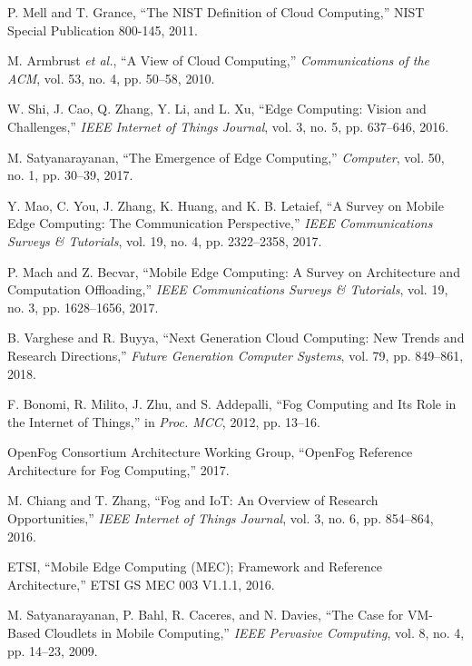 \documentclass[conference]{IEEEtran}
\begin{document}
\begin{thebibliography}{99}

P. Mell and T. Grance, ``The NIST Definition of Cloud Computing,'' NIST Special Publication 800-145, 2011.

M. Armbrust \emph{et al.}, ``A View of Cloud Computing,'' \emph{Communications of the ACM}, vol. 53, no. 4, pp. 50--58, 2010.

W. Shi, J. Cao, Q. Zhang, Y. Li, and L. Xu, ``Edge Computing: Vision and Challenges,'' \emph{IEEE Internet of Things Journal}, vol. 3, no. 5, pp. 637--646, 2016.

M. Satyanarayanan, ``The Emergence of Edge Computing,'' \emph{Computer}, vol. 50, no. 1, pp. 30--39, 2017.

Y. Mao, C. You, J. Zhang, K. Huang, and K. B. Letaief, ``A Survey on Mobile Edge Computing: The Communication Perspective,'' \emph{IEEE Communications Surveys \& Tutorials}, vol. 19, no. 4, pp. 2322--2358, 2017.

P. Mach and Z. Becvar, ``Mobile Edge Computing: A Survey on Architecture and Computation Offloading,'' \emph{IEEE Communications Surveys \& Tutorials}, vol. 19, no. 3, pp. 1628--1656, 2017.

B. Varghese and R. Buyya, ``Next Generation Cloud Computing: New Trends and Research Directions,'' \emph{Future Generation Computer Systems}, vol. 79, pp. 849--861, 2018.

F. Bonomi, R. Milito, J. Zhu, and S. Addepalli, ``Fog Computing and Its Role in the Internet of Things,'' in \emph{Proc. MCC}, 2012, pp. 13--16.

OpenFog Consortium Architecture Working Group, ``OpenFog Reference Architecture for Fog Computing,'' 2017.

M. Chiang and T. Zhang, ``Fog and IoT: An Overview of Research Opportunities,'' \emph{IEEE Internet of Things Journal}, vol. 3, no. 6, pp. 854--864, 2016.

ETSI, ``Mobile Edge Computing (MEC); Framework and Reference Architecture,'' ETSI GS MEC 003 V1.1.1, 2016.

M. Satyanarayanan, P. Bahl, R. Caceres, and N. Davies, ``The Case for VM-Based Cloudlets in Mobile Computing,'' \emph{IEEE Pervasive Computing}, vol. 8, no. 4, pp. 14--23, 2009.


\end{thebibliography}
\end{document}
